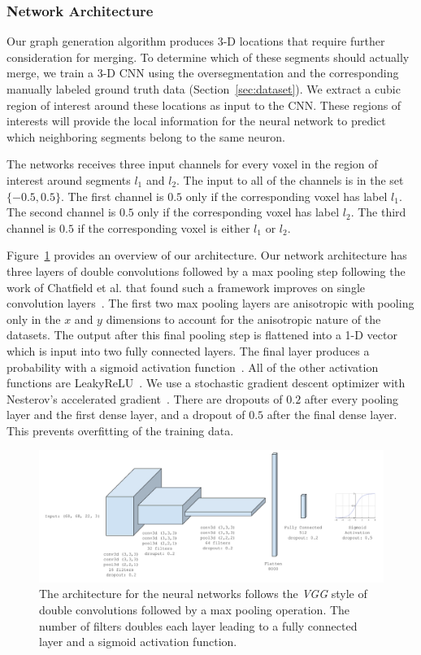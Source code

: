 \subsubsection{Network Architecture}

Our graph generation algorithm produces 3-D locations that require further consideration for merging. 
To determine which of these segments should actually merge, we train a 3-D CNN using the oversegmentation and the corresponding manually labeled ground truth data (Section~\ref{sec:dataset}).
We extract a cubic region of interest around these locations as input to the CNN. 
These regions of interests will provide the local information for the neural network to predict which neighboring segments belong to the same neuron. 

The networks receives three input channels for every voxel in the region of interest around segments $l_1$ and $l_2$. 
The input to all of the channels is in the set $\{-0.5, 0.5\}$. 
The first channel is $0.5$ only if the corresponding voxel has label $l_1$. 
The second channel is $0.5$ only if the corresponding voxel has label $l_2$. 
The third channel is $0.5$ if the corresponding voxel is either $l_1$ or $l_2$. 

Figure~\ref{fig:architecture} provides an overview of our architecture. 
Our network architecture has three layers of double convolutions followed by a max pooling step following the work of Chatfield et al. that found such a framework improves on single convolution layers~\cite{chatfield2014return}. The first two max pooling layers are anisotropic with pooling only in the $x$ and $y$ dimensions to account for the anisotropic nature of the datasets.
The output after this final pooling step is flattened into a 1-D vector which is input into two fully connected layers.
The final layer produces a probability with a sigmoid activation function~\cite{funahashi1989approximate}. 
All of the other activation functions are LeakyReLU~\cite{maas2013rectifier}. 
We use a stochastic gradient descent optimizer with Nesterov's accelerated gradient~\cite{nesterov1983method}. 
There are dropouts of $0.2$ after every pooling layer and the first dense layer, and a dropout of $0.5$ after the final dense layer. 
This prevents overfitting of the training data.


\begin{figure}[t]
	\centering
	\includegraphics[width=0.95\linewidth]{figures/architecture.png}
	\caption{The architecture for the neural networks follows the \textit{VGG} style of double convolutions followed by a max pooling operation. The number of filters doubles each layer leading to a fully connected layer and a sigmoid activation function.}
	\label{fig:architecture}
\end{figure}

